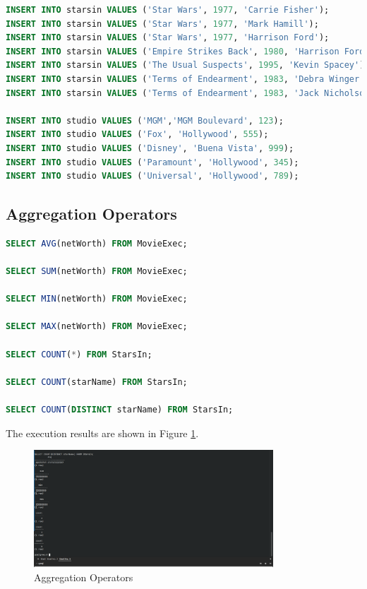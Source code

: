 \documentclass{cshwk}
\begin{document}
\begin{lstlisting}[language=sql]
INSERT INTO starsin VALUES ('Star Wars', 1977, 'Carrie Fisher');
INSERT INTO starsin VALUES ('Star Wars', 1977, 'Mark Hamill');
INSERT INTO starsin VALUES ('Star Wars', 1977, 'Harrison Ford');
INSERT INTO starsin VALUES ('Empire Strikes Back', 1980, 'Harrison Ford');
INSERT INTO starsin VALUES ('The Usual Suspects', 1995, 'Kevin Spacey');
INSERT INTO starsin VALUES ('Terms of Endearment', 1983, 'Debra Winger');
INSERT INTO starsin VALUES ('Terms of Endearment', 1983, 'Jack Nicholson');

INSERT INTO studio VALUES ('MGM','MGM Boulevard', 123);
INSERT INTO studio VALUES ('Fox', 'Hollywood', 555);
INSERT INTO studio VALUES ('Disney', 'Buena Vista', 999);
INSERT INTO studio VALUES ('Paramount', 'Hollywood', 345);
INSERT INTO studio VALUES ('Universal', 'Hollywood', 789);
\end{lstlisting}

\subsection{Aggregation Operators}

\begin{lstlisting}[language=sql]
SELECT AVG(netWorth) FROM MovieExec;

SELECT SUM(netWorth) FROM MovieExec;

SELECT MIN(netWorth) FROM MovieExec;

SELECT MAX(netWorth) FROM MovieExec;

SELECT COUNT(*) FROM StarsIn;

SELECT COUNT(starName) FROM StarsIn;

SELECT COUNT(DISTINCT starName) FROM StarsIn;
\end{lstlisting}

The execution results are shown in Figure \ref{fig:aggregation-operators}.
\begin{figure}[H]
    \centering
    \includegraphics[width=0.8\textwidth]{hw6-2.png}
    \caption{Aggregation Operators}
    \label{fig:aggregation-operators}
\end{figure}
\end{document}

